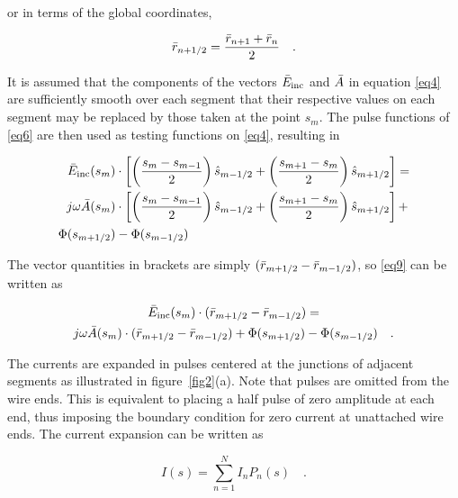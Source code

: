 \documentclass[12pt]{article}
\begin{document}
\noindent or in terms of the global coordinates,

\begin{equation}
\bar{r}_{n+1/2} = \frac{\bar{r}_{n+1} + \bar{r}_n}{2}
\quad.
\label{eq8}
\end{equation}

It is assumed that the components of the vectors $\bar{E}_{\mathrm{inc}}$
and $\bar{A}$ in equation \eqref{eq4} are sufficiently smooth over each
segment that their respective values on each segment may be replaced by
those taken at the point $s_m$. The pulse functions of \eqref{eq6} are
then used as testing functions on \eqref{eq4}, resulting in

\begin{equation}
\begin{aligned}
\bar{E}_{\mathrm{inc}}(s_m)&\cdot
\left[\left(\frac{s_m-s_{m-1}}{2}\right)\hat{s}_{m-1/2}
+ \left(\frac{s_{m+1} - s_m}{2}\right)\hat{s}_{m+1/2}\right] = \\
j\omega\bar{A}(s_m)&\cdot
\left[\left(\frac{s_m-s_{m-1}}{2}\right)\hat{s}_{m-1/2}
+ \left(\frac{s_{m+1}-s_m}{2}\right)\hat{s}_{m+1/2}\right] + \\
\Phi(s_{m+1/2}) &- \Phi(s_{m-1/2}) \\
\end{aligned}
\label{eq9}
\end{equation}

The vector quantities in brackets are simply
$(\bar{r}_{m+1/2} - \bar{r}_{m-1/2})$,
so \eqref{eq9} can be written as

\begin{equation}
\begin{gathered}
\bar{E}_{\mathrm{inc}}(s_m)\cdot(\bar{r}_{m+1/2}-\bar{r}_{m-1/2}) = \\
j\omega\bar{A}(s_m)\cdot(\bar{r}_{m+1/2}-\bar{r}_{m-1/2})
+\Phi(s_{m+1/2}) - \Phi(s_{m-1/2})
\quad.
\end{gathered}
\label{eq10}
\end{equation}

The currents are expanded in pulses centered at the junctions of
adjacent segments as illustrated in figure~\ref{fig2}(a). Note that pulses
are omitted from the wire ends. This is equivalent to placing a half
pulse of zero amplitude at each end, thus imposing the boundary
condition for zero current at unattached wire ends. The current
expansion can be written as

\begin{equation}
I(s) = \sum_{n=1}^{N} I_n P_n (s)
\quad.
\label{eq11}
\end{equation}
\end{document}
